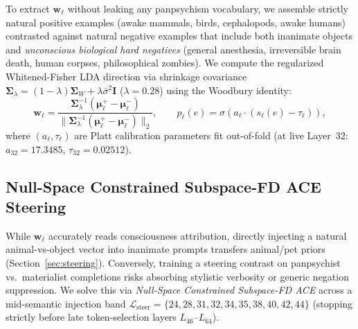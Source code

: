 \documentclass[10pt]{article}
\begin{document}
To extract $\mathbf{w}_\ell$ without leaking any panpsychism vocabulary, we assemble strictly natural positive examples (awake mammals, birds, cephalopods, awake humans) contrasted against natural negative examples that include both inanimate objects and \emph{unconscious biological hard negatives} (general anesthesia, irreversible brain death, human corpses, philosophical zombies). We compute the regularized Whitened-Fisher LDA direction via shrinkage covariance $\boldsymbol{\Sigma}_\lambda = (1-\lambda)\boldsymbol{\Sigma}_W + \lambda \bar{\sigma}^2 \mathbf{I}$ ($\lambda = 0.28$) using the Woodbury identity:
\begin{equation}
  \mathbf{w}_\ell = \frac{\boldsymbol{\Sigma}_\lambda^{-1}(\boldsymbol{\mu}_\ell^{+} - \boldsymbol{\mu}_\ell^{-})}{\|\boldsymbol{\Sigma}_\lambda^{-1}(\boldsymbol{\mu}_\ell^{+} - \boldsymbol{\mu}_\ell^{-})\|_2}, \qquad
  p_\ell(e) = \sigma\!\left(a_\ell \cdot (s_\ell(e) - \tau_\ell)\right),
\end{equation}
where $(a_\ell, \tau_\ell)$ are Platt calibration parameters fit out-of-fold (at live Layer~32: $a_{32} = 17.3485$, $\tau_{32} = 0.02512$).

\subsection{Null-Space Constrained Subspace-FD ACE Steering}

While $\mathbf{w}_\ell$ accurately reads consciousness attribution, directly injecting a natural animal-vs-object vector into inanimate prompts transfers animal/pet priors (Section~\ref{sec:steering}). Conversely, training a steering contrast on panpsychist vs.\ materialist completions risks absorbing stylistic verbosity or generic negation suppression. We solve this via \emph{Null-Space Constrained Subspace-FD ACE} across a mid-semantic injection band $\mathcal{L}_{\text{steer}} = \{24, 28, 31, 32, 34, 35, 38, 40, 42, 44\}$ (stopping strictly before late token-selection layers $L_{46}$--$L_{64}$).
\end{document}
